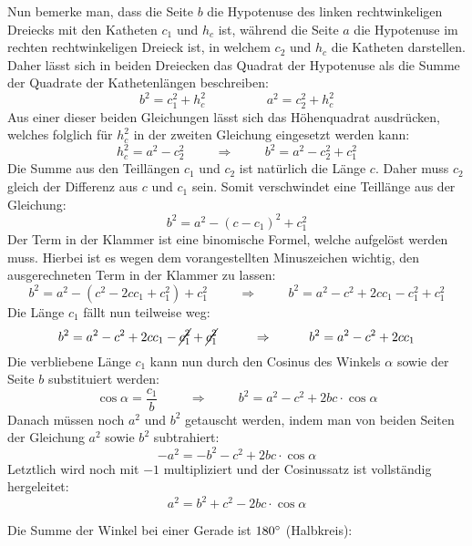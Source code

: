 Nun bemerke man, dass die Seite $b$ die Hypotenuse des linken rechtwinkeligen Dreiecks mit den Katheten $c_1$ und $h_c$ ist, w\"{a}hrend die Seite $a$ die Hypotenuse im rechten rechtwinkeligen Dreieck ist, in welchem $c_2$ und $h_c$ die Katheten darstellen. Daher l\"{a}sst sich in beiden Dreiecken das Quadrat der Hypotenuse als die Summe der Quadrate der Kathetenl\"{a}ngen beschreiben: $$b^2 = c_1^2 + h_c^2 \hspace{2cm} a^2 = c_2^2 + h_c^2$$ Aus einer dieser beiden Gleichungen l\"{a}sst sich das H\"{o}henquadrat ausdr\"{u}cken, welches folglich f\"{u}r $h_c^2$ in der zweiten Gleichung eingesetzt werden kann: $$h_c^2 = a^2 - c_2^2 \hspace{1cm} \Rightarrow \hspace{1cm} b^2 = a^2 - c_2^2 + c_1^2$$ Die Summe aus den Teill\"{a}ngen $c_1$ und $c_2$ ist nat\"{u}rlich die L\"{a}nge $c$. Daher muss $c_2$ gleich der Differenz aus $c$ und $c_1$ sein. Somit verschwindet eine Teill\"{a}nge aus der Gleichung: $$b^2 = a^2 - (c - c_1)^2 + c_1^2$$ Der Term in der Klammer ist eine binomische Formel, welche aufgel\"{o}st werden muss. Hierbei ist es wegen dem vorangestellten Minuszeichen wichtig, den ausgerechneten Term in der Klammer zu lassen: $$b^2 = a^2 - (c^2 - 2cc_1 + c_1^2) + c_1^2 \hspace{1cm} \Rightarrow \hspace{1cm} b^2 = a^2 - c^2 + 2cc_1 - c_1^2 + c_1^2$$ Die L\"{a}nge $c_1$ f\"{a}llt nun teilweise weg: $$b^2 = a^2 - c^2 + 2cc_1 - \cancel{c_1^2} + \cancel{c_1^2} \hspace{1cm} \Rightarrow \hspace{1cm} b^2 = a^2 - c^2 + 2cc_1$$ Die verbliebene L\"{a}nge $c_1$ kann nun durch den Cosinus des Winkels $\alpha$ sowie der Seite $b$ substituiert werden: $$\cos \alpha = \frac{c_1}{b} \hspace{1cm} \Rightarrow \hspace{1cm} b^2 = a^2 - c^2 + 2bc \cdot \cos \alpha$$ Danach m\"{u}ssen noch $a^2$ und $b^2$ getauscht werden, indem man von beiden Seiten der Gleichung $a^2$ sowie $b^2$ subtrahiert: $$-a^2 = -b^2 - c^2 + 2bc \cdot \cos \alpha$$ Letztlich wird noch mit $-1$ multipliziert und der Cosinussatz ist vollst\"{a}ndig hergeleitet: $$a^2 = b^2 + c^2 - 2bc \cdot \cos \alpha$$

\pagebreak


Die Summe der Winkel bei einer Gerade ist $180\degree$ (Halbkreis):

